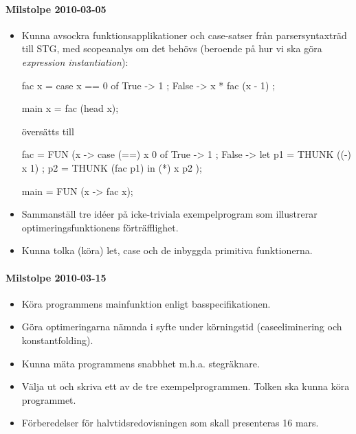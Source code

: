 \documentclass[../Appendix]{subfiles}
\begin{document}
\paragraph{Milstolpe 2010-03-05}
\begin{itemize}
\item Kunna avsockra funktionsapplikationer och case-satser från parsersyntaxträd
till STG, med scopeanalys om det behövs (beroende på hur vi ska göra
\textit{expression instantiation}):

\begin{codeEx}
fac x = case x == 0 of
	{ True -> 1
	; False -> x * fac (x - 1)
    };

main x = fac (head x);
\end{codeEx}
översätts till

\begin{codeEx}
fac = FUN (x -> case (==) x 0 of 
    { True  -> 1
    ; False -> let { p1 = THUNK ((-) x 1)
	               ; p2 = THUNK (fac p1)
	               } in (*) x p2 
    });

main = FUN (x -> fac x);
\end{codeEx}

\item Sammanställ tre idéer på icke-triviala exempelprogram som illustrerar
optimeringsfunktionens förträfflighet.
\item Kunna tolka (köra) let, case och de inbyggda primitiva funktionerna.
\end{itemize}

\paragraph{Milstolpe 2010-03-15}
\begin{itemize}
\item Köra programmens mainfunktion enligt basspecifikationen.
\item Göra optimeringarna nämnda i syfte under körningstid (caseeliminering
och konstantfolding).
\item Kunna mäta programmens snabbhet m.h.a. stegräknare.
\item Välja ut och skriva ett av de tre exempelprogrammen. Tolken ska kunna
köra programmet.
\item Förberedelser för halvtidsredovisningen som skall presenteras 16
mars.
\end{itemize}
\end{document}

